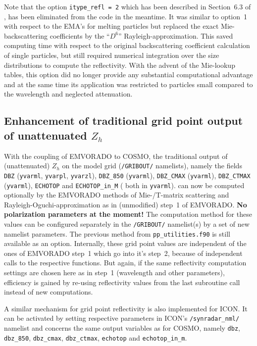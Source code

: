 \documentclass[10pt,a4paper,twoside,headinclude,footinclude,parskip=half]{scrartcl}
\newcommand{\myaktuellesection}{sec:intro}%
\newcommand{\labelsec}[1]{\label{#1}\renewcommand{\myaktuellesection}{#1}}%
\newcommand{\labelsec}[1]{\label{#1}}%
\newcommand{\citeP}[1]{\citet{#1}}
\newcommand{\srcform}[1]{\mbox{\texttt{#1}}\xspace}%
\begin{document}
Note that the option \srcform{itype_refl = 2} which has been described in Section~6.3 of \citeP{blahak2016a}, has been eliminated from the code in the meantime.
It was similar to option~1 with respect to the EMA's for melting particles but replaced the exact Mie-backscattering coefficients by the ``$D^6$'' Rayleigh-approximation.
This saved computing time with respect to the original backscattering coefficient calculation of single particles, but still required numerical integration over the size distributions to
compute the reflectivity. With the advent of the Mie-lookup tables, this option did no longer provide any substantial computational advantage and at the same time
its application was restricted to particles small compared to the wavelength and neglected attenuation.


\subsection{Enhancement of traditional grid point output of unattenuated $Z_h$}

\labelsec{sec:intro:gpout}

With the coupling of EMVORADO to COSMO, the traditional output of (unattenuated) $Z_h$ on the model grid (\srcform{/GRIBOUT/} namelists), namely the fields
\srcform{DBZ} (\srcform{yvarml}, \srcform{yvarpl}, \srcform{yvarzl}), \srcform{DBZ_850} (\srcform{yvarml}), \srcform{DBZ_CMAX} (\srcform{yvarml}), \srcform{DBZ_CTMAX} (\srcform{yvarml}), \srcform{ECHOTOP} and \srcform{ECHOTOP_in_M} ( both in \srcform{yvarml}).
can now be computed optionally by the EMVORADO methods of Mie-/T-matrix scattering and Rayleigh-Oguchi-approximation as in (unmodified) step~1 of EMVORADO. \textbf{No polarization parameters at the moment!}
The computation method for these values can be
configured separately in the \srcform{/GRIBOUT/} namelist(s) by a set of new namelist parameters. The previous method from \srcform{pp_utilities.f90} is still available as an option.
Internally, these grid point values are independent of the ones of EMVORADO step~1 which go into it's step~2, because of independent calls to the
respective functions.
But again, if the same reflectivity computation settings are chosen here as in
step~1 (wavelength and other parameters), efficiency is gained by re-using reflectivity values from the last subroutine call instead of new computations.

A similar mechanism for grid point reflectivity is also implemented for ICON. It can be activated by setting respective parameters in ICON's \srcform{/synradar_nml/} namelist and concerns the same output variables as for COSMO, namely \srcform{dbz}, \srcform{dbz_850}, \srcform{dbz_cmax}, \srcform{dbz_ctmax}, \srcform{echotop} and \srcform{echotop_in_m}.
\end{document}
